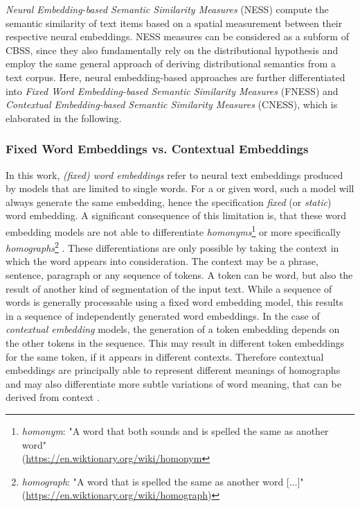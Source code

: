 \documentclass[11pt]{scrreprt}
\let\cite\parencite  %
\begin{document}


\textit{Neural Embedding-based Semantic Similarity Measures} (NESS) compute the semantic similarity of text items based on a spatial measurement between their respective neural embeddings. NESS measures can be considered as a subform of CBSS, since they also fundamentally rely on the distributional hypothesis and employ the same general approach of deriving distributional semantics from a text corpus. Here, neural embedding-based approaches are further differentiated into \textit{Fixed Word Embedding-based Semantic Similarity Measures} (FNESS) and \textit{Contextual Embedding-based Semantic Similarity Measures} (CNESS), which is elaborated in the following.


\subsubsection{Fixed Word Embeddings vs. Contextual Embeddings}
In this work, \textit{(fixed) word embeddings} refer to neural text embeddings produced by models  that are limited to single words. For a or given word, such a model will always generate the same embedding, hence the specification \textit{fixed} (or \textit{static}) word embedding. A significant consequence of this limitation is, that these word embedding models are not able to differentiate \textit{homonyms}\footnote{\textit{homonym}: "A word that both sounds and is spelled the same as another word"\\(\url{https://en.wiktionary.org/wiki/homonym}} or more specifically \textit{homographs}\footnote{\textit{homograph}: "A word that is spelled the same as another word [...]"\\(\url{https://en.wiktionary.org/wiki/homograph})} \cite{liWordEmbeddingUnderstanding2018}. These differentiations are only possible by taking the context in which the word appears into consideration. The context may be a phrase, sentence, paragraph or any sequence of tokens. A token can be word, but also the result of another kind of segmentation of the input text. While a sequence of words is generally processable using a fixed word embedding model, this results in a sequence of independently generated word embeddings. In the case of \textit{contextual embedding} models, the generation of a token embedding depends on the other tokens in the sequence. This may result in different token embeddings for the same token, if it appears in different contexts. Therefore contextual embeddings are principally able to represent different meanings of homographs and may also differentiate more subtle variations of word meaning, that can be derived from context \cite{liuSurveyContextualEmbeddings2020}.
\end{document}
